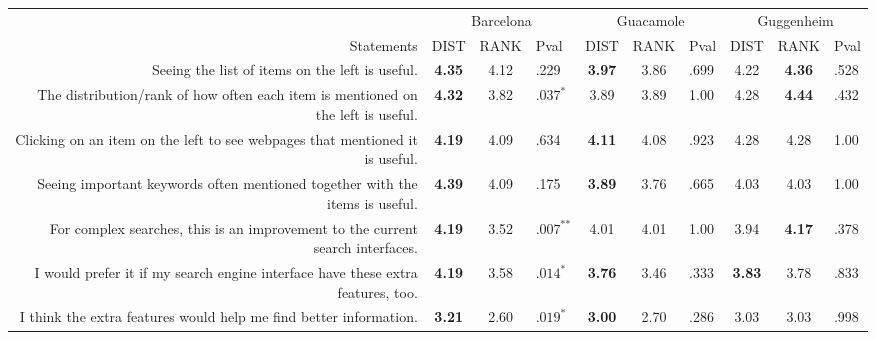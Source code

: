 
\begin{table*}[h]
    \centering
    \begin{tabular}{r | c c l | c c l | c c l}
    \hline
    & \multicolumn{3}{c|}{Barcelona} & \multicolumn{3}{c|}{Guacamole} & \multicolumn{3}{c}{Guggenheim} \\ 
        Statements & DIST & RANK & Pval & DIST & RANK & Pval & DIST & RANK & Pval \\
        \hline
        
        
        \multicolumn{1}{p{0.65\columnwidth}|}{Seeing the list of items on the left is useful.} & 
        \textbf{4.35} & 4.12 & .229 & 
        \textbf{3.97} & 3.86 & .699 & 
        4.22 & \textbf{4.36} & .528 \\
        \hline
        
        \multicolumn{1}{p{0.65\columnwidth}|}{The distribution/rank of how often each item is mentioned on the left is useful.} &
        \textbf{4.32} & 3.82 & $.037^{\textbf{*}}$ & 
        3.89 & 3.89 & 1.00 &
        4.28 & \textbf{4.44} & .432 \\
        \hline
        
        \multicolumn{1}{p{0.65\columnwidth}|}{Clicking on an item on the left to see webpages that mentioned it is useful.} &
        \textbf{4.19} & 4.09 & .634 & 
        \textbf{4.11} & 4.08 & .923 & 
        4.28 & 4.28 & 1.00 \\
        \hline
        
        \multicolumn{1}{p{0.65\columnwidth}|}{Seeing important keywords often mentioned together with the items is useful.} &
        \textbf{4.39} & 4.09 & .175 &
        \textbf{3.89} & 3.76 & .665 &
        4.03 & 4.03 & 1.00 \\
        \hline
        
        \multicolumn{1}{p{0.65\columnwidth}|}{For complex searches, this is an improvement to the current search interfaces.} &
        \textbf{4.19} & 3.52 & $.007^{\textbf{**}}$ &
        4.01 & 4.01 & 1.00 &
        3.94 & \textbf{4.17} & .378 \\
        \hline
        
        \multicolumn{1}{p{0.65\columnwidth}|}{I would prefer it if my search engine interface have these extra features, too.} &
        \textbf{4.19} & 3.58 & $.014^{\textbf{*}}$ &
        \textbf{3.76} & 3.46  & .333 &
        \textbf{3.83} & 3.78 & .833 \\
        \hline
        
        \multicolumn{1}{p{0.65\columnwidth}|}{I think the extra features would help me find better information.} &
        \textbf{3.21} & 2.60 & $.019^{\textbf{*}}$&
        \textbf{3.00} & 2.70 & .286 &
        3.03 & 3.03 & .998 \\
        

\end{tabular}
\end{table*}
